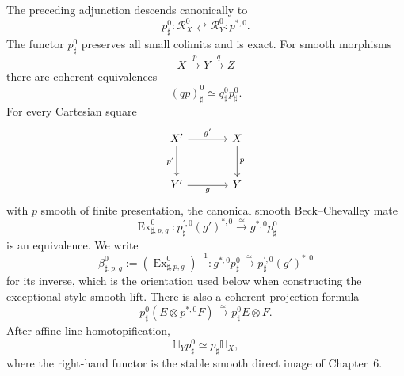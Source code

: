 \begin{theorem}
\label{thm:bn-diff-thom-stable-smooth-direct-image}
The preceding adjunction descends canonically to
\[
  \boxed{
  p_\sharp^0:
  \mathcal R_X^0
  \rightleftarrows
  \mathcal R_Y^0:
  p^{*,0}.
  }
\]
The functor \(p_\sharp^0\) preserves all small colimits and is exact.  For
smooth morphisms
\[
  X\xrightarrow{p}Y\xrightarrow{q}Z
\]
there are coherent equivalences
\[
  (qp)_\sharp^0\simeq q_\sharp^0p_\sharp^0.
\]
For every Cartesian square
\[
\begin{tikzcd}[column sep=large,row sep=large]
X' \ar[r,"g'"] \ar[d,"p'"'] & X \ar[d,"p"]\\
Y' \ar[r,"g"'] & Y
\end{tikzcd}
\]
with \(p\) smooth of finite presentation, the canonical smooth
Beck--Chevalley mate
\[
  \boxed{
  \operatorname{Ex}_{\sharp,p,g}^{0}:
  p_\sharp^{\prime,0}(g')^{*,0}
  \xrightarrow{\simeq}
  g^{*,0}p_\sharp^0
  }
\]
is an equivalence.  We write
\[
  \boxed{
  \beta_{\sharp,p,g}^{0}
  :=
  \left(\operatorname{Ex}_{\sharp,p,g}^{0}\right)^{-1}:
  g^{*,0}p_\sharp^0
  \xrightarrow{\simeq}
  p_\sharp^{\prime,0}(g')^{*,0}
  }
\]
for its inverse, which is the orientation used below when constructing the
exceptional-style smooth lift.
There is also a coherent projection formula
\[
  \boxed{
  p_\sharp^0(E\otimes p^{*,0}F)
  \xrightarrow{\simeq}
  p_\sharp^0E\otimes F.
  }
\]
After affine-line homotopification,
\[
  \boxed{
  \mathbb H_Yp_\sharp^0
  \simeq
  p_\sharp\mathbb H_X,
  }
\]
where the right-hand functor is the stable smooth direct image of Chapter~6.
\end{theorem}

